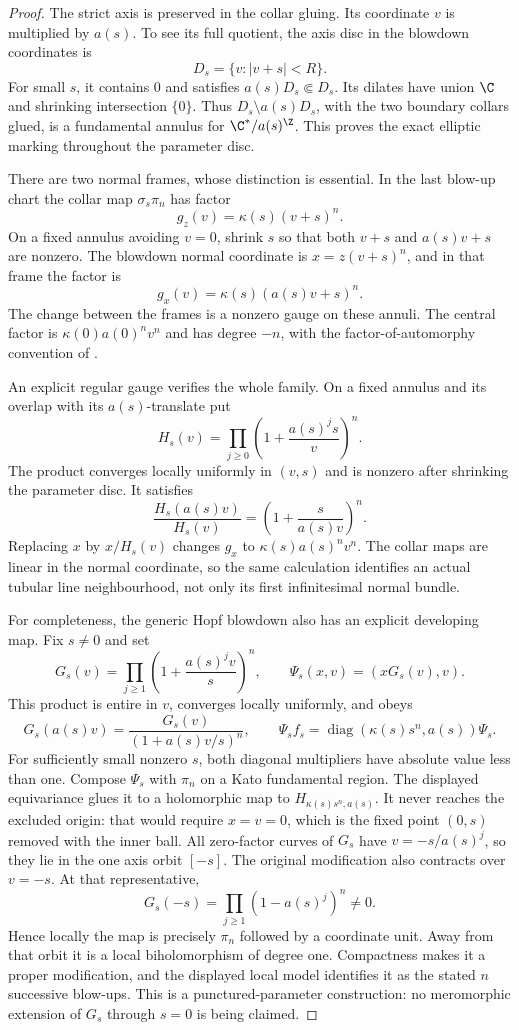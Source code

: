 \begin{proof}
The strict axis is preserved in the collar gluing. Its coordinate
$v$ is multiplied by $a(s)$. To see its full quotient, the axis disc
in the blowdown coordinates is
\[
 D_s=\{v:|v+s|<R\}.
\]
For small $s$, it contains $0$ and satisfies $a(s)D_s\Subset D_s$.
Its dilates have union $\C$ and shrinking intersection $\{0\}$.
Thus $D_s\setminus a(s)D_s$, with the two boundary collars glued,
is a fundamental annulus for $\C^*/a(s)^\Z$.
This proves the exact elliptic marking throughout the parameter disc.

There are two normal frames, whose distinction is essential.
In the last blow-up chart the collar map $\sigma_s\pi_n$ has factor
\[
 g_z(v)=\kappa(s)(v+s)^n.
\]
On a fixed annulus avoiding $v=0$, shrink $s$ so that both
$v+s$ and $a(s)v+s$ are nonzero. The blowdown normal coordinate is
$x=z(v+s)^n$, and in that frame the factor is
\[
 g_x(v)=\kappa(s)(a(s)v+s)^n.
\]
The change between the frames is a nonzero gauge on these annuli.
The central factor is $\kappa(0)a(0)^n v^n$ and has degree $-n$,
with the factor-of-automorphy convention of
\citet[Proposition 5.6, pp.1369--1370]{IstratiEtAl2022Root}.

An explicit regular gauge verifies the whole family. On a fixed
annulus and its overlap with its $a(s)$-translate put
\[
 H_s(v)=\prod_{j\ge0}\left(1+\frac{a(s)^j s}{v}\right)^n.
\]
The product converges locally uniformly in $(v,s)$ and is nonzero
after shrinking the parameter disc. It satisfies
\[
 \frac{H_s(a(s)v)}{H_s(v)}
      =\left(1+\frac{s}{a(s)v}\right)^n.
\]
Replacing $x$ by $x/H_s(v)$ changes $g_x$ to
$\kappa(s)a(s)^n v^n$.
The collar maps are linear in the normal coordinate, so the same
calculation identifies an actual tubular line neighbourhood, not
only its first infinitesimal normal bundle.

For completeness, the generic Hopf blowdown also has an explicit
developing map. Fix $s\ne0$ and set
\[
 G_s(v)=\prod_{j\ge1}\left(1+\frac{a(s)^j v}{s}\right)^n,
       \qquad
 \Psi_s(x,v)=(xG_s(v),v).
\]
This product is entire in $v$, converges locally uniformly, and obeys
\[
 G_s(a(s)v)=\frac{G_s(v)}{(1+a(s)v/s)^n},\qquad
 \Psi_s f_s=\operatorname{diag}(\kappa(s)s^n,a(s))\Psi_s.
\]
For sufficiently small nonzero $s$, both diagonal multipliers have
absolute value less than one. Compose $\Psi_s$ with $\pi_n$ on a
Kato fundamental region. The displayed equivariance glues it to a
holomorphic map to $H_{\kappa(s)s^n,a(s)}$.
It never reaches the excluded origin: that would require
$x=v=0$, which is the fixed point $(0,s)$ removed with the inner ball.
All zero-factor curves of $G_s$ have
$v=-s/a(s)^j$, so they lie in the one axis orbit $[-s]$.
The original modification also contracts over $v=-s$.
At that representative,
\[
 G_s(-s)=\prod_{j\ge1}(1-a(s)^j)^n\ne0.
\]
Hence locally the map is precisely $\pi_n$ followed by a coordinate
unit. Away from that orbit it is a local biholomorphism of degree
one. Compactness makes it a proper modification, and the displayed
local model identifies it as the stated $n$ successive blow-ups.
This is a punctured-parameter construction: no meromorphic extension
of $G_s$ through $s=0$ is being claimed.


\end{proof}
